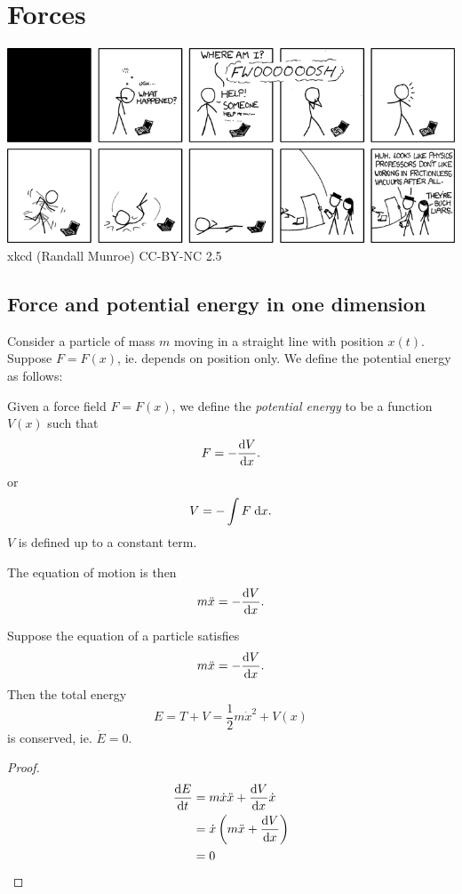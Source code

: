 \documentclass[a4paper]{article}
\begin{document}
\section{Forces}
\begin{center}
  \includegraphics[scale=.45]{images/xkcd_experiment.png}\\
  xkcd (Randall Munroe) CC-BY-NC 2.5
\end{center}
\subsection{Force and potential energy in one dimension}
Consider a particle of mass $m$ moving in a straight line with position $x(t)$. Suppose $F = F(x)$, ie. depends on position only. We define the potential energy as follows:
\begin{defi}
  Given a force field $F = F(x)$, we define the \emph{potential energy} to be a function $V(x)$ such that
  \[
    F = -\frac{\mathrm{d} V}{\mathrm{d} x}.
  \]
  or
  \[
    V = -\int F \;\mathrm{d} x.
  \]
  $V$ is defined up to a constant term.
\end{defi}

The equation of motion is then
\[
  m\ddot{x} = -\frac{\mathrm{d} V}{\mathrm{d} x}.
\]
\begin{prop}
  Suppose the equation of a particle satisfies
  \[
    m\ddot{x} = -\frac{\mathrm{d} V}{\mathrm{d} x}.
  \]
  Then the total energy
  \[
    E = T + V = \frac{1}{2} m\dot{x}^2 + V(x)
  \]
  is conserved, ie. $\dot{E} = 0$.
\end{prop}

\begin{proof}
  \begin{align*}
    \frac{\mathrm{d} E}{\mathrm{d} t} &= m\dot{x}\ddot{x} + \frac{\mathrm{d} V}{\mathrm{d} x}\dot{x}\\
    &= \dot{x}\left(m\ddot{x} + \frac{\mathrm{d} V}{\mathrm{d} x}\right)\\
    &= 0
  \end{align*}
\end{proof}
\end{document}
